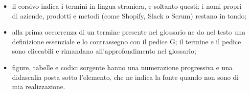 \begin{itemize}
        \item il corsivo indica i termini in lingua straniera, e soltanto questi; i nomi propri di
	aziende, prodotti e metodi (come Shopify, Slack o Scrum) restano in tondo;
        \item alla prima occorrenza di un termine presente nel glossario ne do nel testo una
	definizione essenziale e lo contrassegno con il pedice G; il termine e il pedice sono cliccabili e
	rimandano all’approfondimento nel glossario;
        \item figure, tabelle e codici sorgente hanno una numerazione progressiva e una didascalia
	posta sotto l’elemento, che ne indica la fonte quando non sono di mia realizzazione.
\end{itemize}
